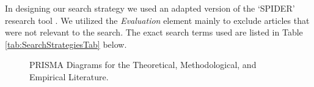 \documentclass[man, 12pt, a4paper, mask]{apa7}
\begin{document}
In designing our search strategy we used an adapted version of the `SPIDER' research tool \citep[e.g.,][]{Cooke2012}. We utilized the \textit{Evaluation} element mainly to exclude articles that were not relevant to the search. The exact search terms used are listed in Table \ref{tab:SearchStrategiesTab} below.



\begin{figure}
\centering
\caption{PRISMA Diagrams for the Theoretical, Methodological, and Empirical Literature.}
\label{fig:PrismaCombined}
\end{figure}
\end{document}
